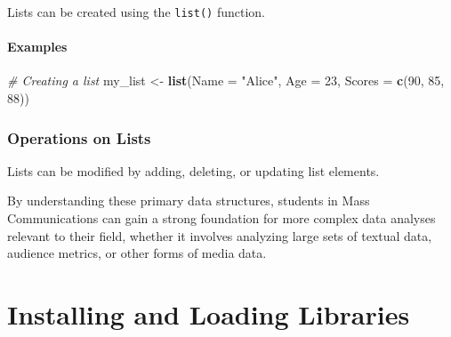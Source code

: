 \documentclass[
  b5paper]{book}
\newenvironment{Shaded}{\begin{snugshade}}{\end{snugshade}}
\newcommand{\AttributeTok}[1]{\textcolor[rgb]{0.13,0.29,0.53}{#1}}
\newcommand{\CommentTok}[1]{\textcolor[rgb]{0.56,0.35,0.01}{\textit{#1}}}
\newcommand{\DecValTok}[1]{\textcolor[rgb]{0.00,0.00,0.81}{#1}}
\newcommand{\FunctionTok}[1]{\textcolor[rgb]{0.13,0.29,0.53}{\textbf{#1}}}
\newcommand{\NormalTok}[1]{#1}
\newcommand{\OtherTok}[1]{\textcolor[rgb]{0.56,0.35,0.01}{#1}}
\newcommand{\SpecialCharTok}[1]{\textcolor[rgb]{0.81,0.36,0.00}{\textbf{#1}}}
\newcommand{\StringTok}[1]{\textcolor[rgb]{0.31,0.60,0.02}{#1}}
\begin{document}
Lists can be created using the \texttt{list()} function.

\hypertarget{examples-5}{%
\paragraph*{Examples}\label{examples-5}}

\begin{Shaded}
\begin{Highlighting}[]
\CommentTok{\# Creating a list}
\NormalTok{my\_list }\OtherTok{\textless{}{-}} \FunctionTok{list}\NormalTok{(}\AttributeTok{Name =} \StringTok{"Alice"}\NormalTok{, }\AttributeTok{Age =} \DecValTok{23}\NormalTok{, }\AttributeTok{Scores =} \FunctionTok{c}\NormalTok{(}\DecValTok{90}\NormalTok{, }\DecValTok{85}\NormalTok{, }\DecValTok{88}\NormalTok{))}
\end{Highlighting}
\end{Shaded}

\hypertarget{operations-on-lists}{%
\subsubsection*{Operations on Lists}\label{operations-on-lists}}

Lists can be modified by adding, deleting, or updating list elements.

\begin{Shaded}
\end{Shaded}

By understanding these primary data structures, students in Mass Communications can gain a strong foundation for more complex data analyses relevant to their field, whether it involves analyzing large sets of textual data, audience metrics, or other forms of media data.

\hypertarget{installing-and-loading-libraries}{%
\section{Installing and Loading Libraries}\label{installing-and-loading-libraries}}
\end{document}
